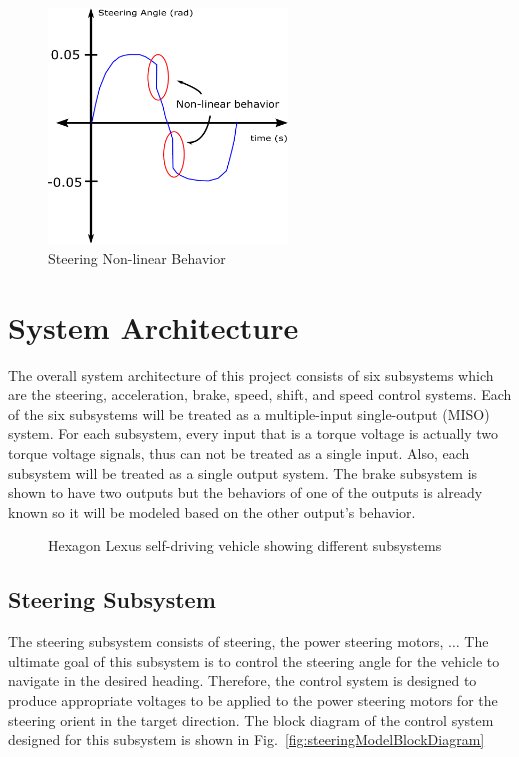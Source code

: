 \documentclass[journal,twoside,web]{ieeecolor}
\begin{document}
\begin{figure}[htbp]
    \centering
    \captionsetup{justification=centering}
    \includegraphics[width=2.5in]{figs/inkscape/nonlinearBehavior}
    \caption{Steering Non-linear Behavior}
    \label{fig:nonlinGraph}
\end{figure}


\section{System Architecture}
The overall system architecture of this project consists of six subsystems which are the steering, acceleration, brake, speed, shift, and speed control systems. Each of the six subsystems will be treated as a multiple-input single-output (MISO) system. For each subsystem, every input that is a torque voltage is actually two torque voltage signals, thus can not be treated as a single input. Also, each subsystem will be treated as a single output system. The brake subsystem is shown to have two outputs but the behaviors of one of the outputs is already known so it will be modeled based  on the other output's behavior. 
%
\begin{figure}[htbp]
  \centering
  \caption{Hexagon Lexus self-driving vehicle showing different subsystems}
  \label{fig:highLevelSystemArchitecture}
\end{figure}


\subsection{Steering Subsystem}
\label{sec:steeringSubsystem}

The steering subsystem consists of steering, the power steering motors, $\ldots$ The ultimate goal of this subsystem is to control the steering angle for the vehicle to navigate in the desired heading. Therefore, the control system is designed to produce appropriate voltages to be applied to the power steering motors for the steering orient in the target direction. The block diagram of the control system designed for this subsystem is shown in Fig.~\ref{fig:steeringModelBlockDiagram}
\end{document}
